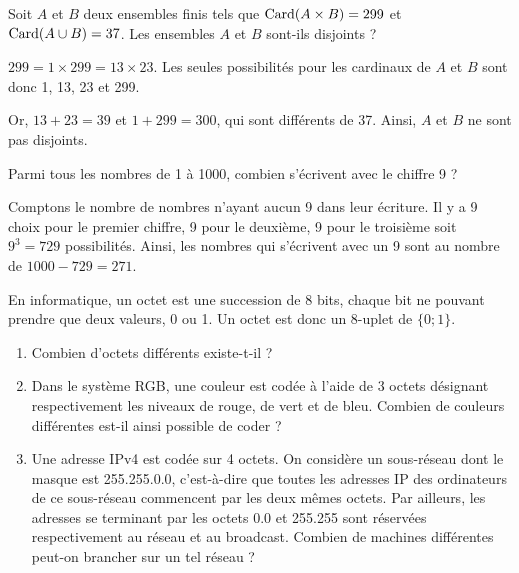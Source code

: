 \documentclass[11pt,fleqn, openany]{book} %
\begin{document}
\begin{exercise}
Soit $A$ et $B$ deux ensembles finis tels que $\mathrm{Card}(A \times B)=299$ et 
$\mathrm{Card}(A \cup B)=37$. Les ensembles $A$ et $B$ sont-ils disjoints ?\end{exercise}

\begin{solution}$299 = 1 \times 299 = 13 \times 23$. Les seules possibilités pour les cardinaux de $A$ et $B$ sont donc 1, 13, 23 et 299.

 Or, $13+23=39$ et $1+299=300$, qui sont différents de 37. Ainsi, $A$ et $B$ ne sont pas disjoints.
\end{solution}



\begin{exercise}Parmi tous les nombres de 1 à 1000, combien s'écrivent avec le chiffre 9 ?\end{exercise}

\begin{solution}Comptons le nombre de nombres n'ayant aucun 9 dans leur écriture. Il y a 9 choix pour le premier chiffre, 9 pour le deuxième, 9 pour le troisième soit $9^3=729$ possibilités. Ainsi, les nombres qui s'écrivent avec un 9 sont au nombre de $1000-729=271$.\newpage \end{solution}




\begin{exercise}En informatique, un octet est une succession de 8 bits, chaque bit ne pouvant prendre que deux valeurs, 0 ou 1. Un octet est donc un 8-uplet de  $\{0;1\}$.
\begin{enumerate}
\item Combien d'octets différents existe-t-il ?
\item Dans le système RGB, une couleur est codée à l'aide de 3 octets désignant respectivement les niveaux de rouge, de vert et de bleu. Combien de couleurs différentes est-il ainsi possible de coder ?
\item Une adresse IPv4 est codée sur 4 octets. On considère un sous-réseau dont le masque est 255.255.0.0, c'est-à-dire que toutes les adresses IP des ordinateurs de ce sous-réseau commencent par les deux mêmes octets. Par ailleurs, les adresses se terminant par les octets 0.0 et 255.255 sont réservées respectivement au réseau et au broadcast. Combien de machines différentes peut-on brancher sur un tel réseau ?
\end{enumerate}\end{exercise}
\end{document}
